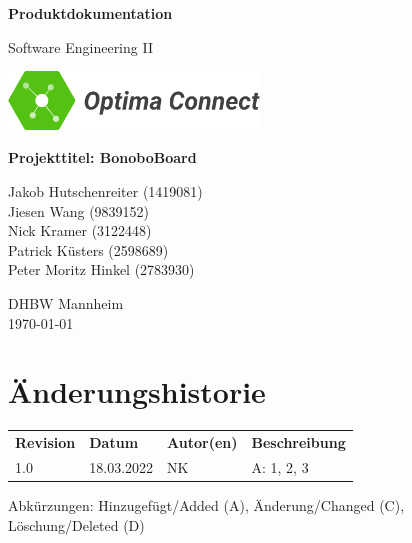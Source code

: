 \documentclass[a4paper,11pt]{scrartcl}
\begin{document}
\renewcommand*{\arraystretch}{1.2}
\begin{titlepage}
    \begin{center}
        \vspace*{1cm}\Huge
        \textbf{Produktdokumentation}\par                
        \vspace{0.5cm}\LARGE        
        Software Engineering II\par           
        \vspace{2cm}
        \includegraphics[width=0.5\textwidth]{OptimaLogo_long}\par   
        \vspace{1cm}
        \textbf{Projekttitel: BonoboBoard}\par        
        \vfill\Large   
        Jakob Hutschenreiter (1419081)\\Jiesen Wang (9839152)\\Nick Kramer (3122448)\\Patrick Küsters (2598689)\\Peter Moritz Hinkel (2783930)\par
        \vspace{2cm}
        DHBW Mannheim\\
        \today     
    \end{center}
\end{titlepage}

\section*{Änderungshistorie}
\begin{table}[h]
	\begin{tabular}{@{} p{20mm} p{25mm} p{25mm} p{75mm}}
		\textbf{Revision} & \textbf{Datum} & \textbf{Autor(en)} & \textbf{Beschreibung}\\
		1.0 & 18.03.2022 & NK & A: 1, 2, 3\\
	\end{tabular}
\end{table}
\noindent
Abkürzungen: Hinzugefügt/Added (A), Änderung/Changed (C), Löschung/Deleted (D)
\vspace{2cm}
\tableofcontents
\newpage
{}
\end{document}
